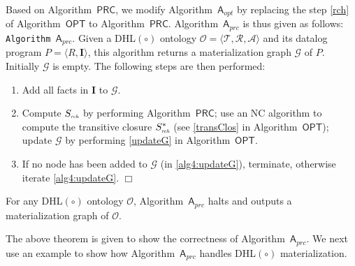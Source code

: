 \documentclass[final,1p,times]{elsarticle}
\begin{document}
Based on Algorithm~$\mathsf{PRC}$, we modify Algorithm~$\mathsf{A}_{opt}$
by replacing the step \ref{rch} of Algorithm~$\mathsf{OPT}$
to Algorithm~$\mathsf{PRC}$. Algorithm~$\mathsf{A}_{prc}$
is thus given as follows:\\

\noindent\texttt{Algorithm~$\mathsf{A}_{prc}$}. Given
a DHL$(\circ)$ ontology $\mathcal{O}=\langle\mathcal{T},\mathcal{R},\mathcal{A}\rangle$ and its
datalog program $P=\langle R, \textbf{I}\rangle$, this algorithm
returns a materialization graph $\mathcal{G}$ of $P$.
Initially $\mathcal{G}$ is empty. The following steps are then performed:
\begin{enumerate}[leftmargin=8ex,label=(\textit{Step \arabic*}),ref=Step~\arabic*]
\item Add all facts in $\textbf{I}$ to $\mathcal{G}$.\label{alg4:addFacts}
\item Compute $S_{\textit{\tiny rch}}$ by performing Algorithm~$\mathsf{PRC}$; use an NC
    algorithm to compute the transitive closure $S^*_{\textit{\tiny rch}}$ (see \ref{transClos} in Algorithm~$\mathsf{OPT}$);
    update $\mathcal{G}$ by performing \ref{updateG} in Algorithm~$\mathsf{OPT}$.\label{alg4:updateG}
\item If no node has been added to $\mathcal{G}$ (in \ref{alg4:updateG}), terminate,
    otherwise iterate \ref{alg4:updateG}. \label{alg4:halt}\hfill$\Box$
\end{enumerate}

\begin{theorem}\label{theorem:aprc}
For any DHL$(\circ)$ ontology $\mathcal{O}$, Algorithm~$\mathsf{A}_{prc}$ halts and outputs
a materialization graph of $\mathcal{O}$.
\end{theorem}

The above theorem is given to show the correctness of Algorithm~$\mathsf{A}_{prc}$.
We next use an example to show how Algorithm~$\mathsf{A}_{prc}$ handles
DHL$(\circ)$ materialization.
\end{document}
